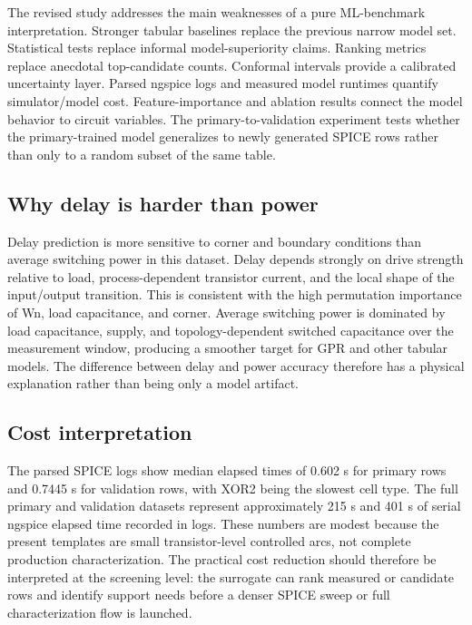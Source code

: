 \documentclass[preprint,12pt]{elsarticle}
\begin{document}
The revised study addresses the main weaknesses of a pure ML-benchmark interpretation. Stronger tabular baselines replace the previous narrow model set. Statistical tests replace informal model-superiority claims. Ranking metrics replace anecdotal top-candidate counts. Conformal intervals provide a calibrated uncertainty layer. Parsed ngspice logs and measured model runtimes quantify simulator/model cost. Feature-importance and ablation results connect the model behavior to circuit variables. The primary-to-validation experiment tests whether the primary-trained model generalizes to newly generated SPICE rows rather than only to a random subset of the same table.

\subsection{Why delay is harder than power}

Delay prediction is more sensitive to corner and boundary conditions than average switching power in this dataset. Delay depends strongly on drive strength relative to load, process-dependent transistor current, and the local shape of the input/output transition. This is consistent with the high permutation importance of Wn, load capacitance, and corner. Average switching power is dominated by load capacitance, supply, and topology-dependent switched capacitance over the measurement window, producing a smoother target for GPR and other tabular models. The difference between delay and power accuracy therefore has a physical explanation rather than being only a model artifact.

\subsection{Cost interpretation}

The parsed SPICE logs show median elapsed times of 0.602 s for primary rows and 0.7445 s for validation rows, with XOR2 being the slowest cell type. The full primary and validation datasets represent approximately 215 s and 401 s of serial ngspice elapsed time recorded in logs. These numbers are modest because the present templates are small transistor-level controlled arcs, not complete production characterization. The practical cost reduction should therefore be interpreted at the screening level: the surrogate can rank measured or candidate rows and identify support needs before a denser SPICE sweep or full characterization flow is launched.
\end{document}
